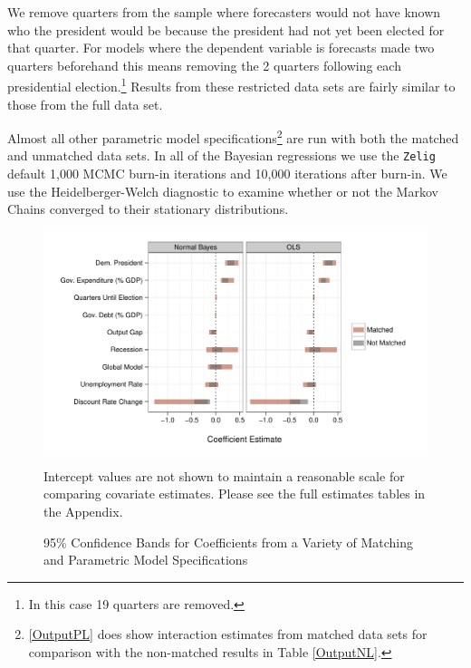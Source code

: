 \documentclass[a4paper]{article}
\begin{document}
We remove quarters from the sample where forecasters would not have known who the president would be because the president had not yet been elected for that quarter. For models where the dependent variable is forecasts made two quarters beforehand this means removing the 2 quarters following each presidential election.\footnote{In this case 19 quarters are removed.} Results from these restricted data sets are fairly similar to those from the full data set.

Almost all other parametric model specifications\footnote{\ref{OutputPL} does show interaction estimates from matched data sets for comparison with the non-matched results in Table \ref{OutputNL}.} are run with both the matched and unmatched data sets. In all of the Bayesian regressions we use the {\tt{Zelig}} default 1,000 MCMC burn-in iterations and 10,000 iterations after burn-in. We use the Heidelberger-Welch diagnostic to examine whether or not the Markov Chains converged to their stationary distributions.




\begin{figure}[t]
    \caption{95\% Confidence Bands for Coefficients from a Variety of Matching and Parametric Model Specifications}
    \label{CoefComparePlots}
    \begin{center}

\begin{knitrout}
\color{fgcolor}\includegraphics[width=0.95\linewidth]{figure/CoefComparePlots} 
\end{knitrout}

    \end{center}
    \begin{singlespace}
        {\scriptsize{Intercept values are not shown to maintain a reasonable scale for comparing covariate estimates. Please see the full estimates tables in the Appendix.}}
    \end{singlespace}
\end{figure}
\end{document}
